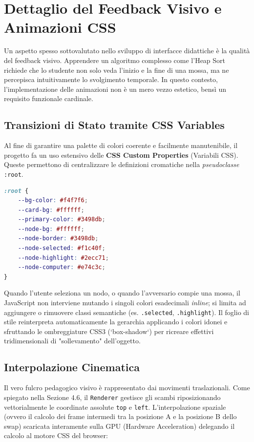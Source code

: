 \documentclass[openany]{theme/uniprthesis}
\begin{document}
\section{Dettaglio del Feedback Visivo e Animazioni CSS}
Un aspetto spesso sottovalutato nello sviluppo di interfacce didattiche è la qualità del feedback visivo. Apprendere un algoritmo complesso come l'Heap Sort richiede che lo studente non solo veda l'inizio e la fine di una mossa, ma ne percepisca intuitivamente lo svolgimento temporale. In questo contesto, l'implementazione delle animazioni non è un mero vezzo estetico, bensì un requisito funzionale cardinale.

\subsection{Transizioni di Stato tramite CSS Variables}
Al fine di garantire una palette di colori coerente e facilmente manutenibile, il progetto fa un uso estensivo delle \textbf{CSS Custom Properties} (Variabili CSS). Queste permettono di centralizzare le definizioni cromatiche nella \textit{pseudoclasse} \texttt{:root}.

\begin{lstlisting}[language=CSS, breaklines=true, basicstyle=\footnotesize\ttfamily, frame=single, caption={Iniezione logica delle Variabili Cromatiche}, keywordstyle=\color{blue}]
:root {
    --bg-color: #f4f7f6;
    --card-bg: #ffffff;
    --primary-color: #3498db;
    --node-bg: #ffffff;
    --node-border: #3498db;
    --node-selected: #f1c40f;
    --node-highlight: #2ecc71;
    --node-computer: #e74c3c;
}
\end{lstlisting}

Quando l'utente seleziona un nodo, o quando l'avversario compie una mossa, il JavaScript non interviene mutando i singoli colori esadecimali \textit{inline}; si limita ad aggiungere o rimuovere classi semantiche (es. \texttt{.selected}, \texttt{.highlight}). Il foglio di stile reinterpreta automaticamente la gerarchia applicando i colori idonei e sfruttando le ombreggiature CSS3 (`box-shadow`) per ricreare effettivi tridimensionali di "sollevamento" dell'oggetto.

\subsection{Interpolazione Cinematica}
Il vero fulcro pedagogico visivo è rappresentato dai movimenti traslazionali. Come spiegato nella Sezione 4.6, il \texttt{Renderer} gestisce gli scambi riposizionando vettorialmente le coordinate assolute \texttt{top} e \texttt{left}.
L'interpolazione spaziale (ovvero il calcolo dei frame intermedi tra la posizione A e la posizione B dello swap)  scaricata interamente sulla GPU (Hardware Acceleration) delegando il calcolo al motore CSS del browser:
\end{document}
